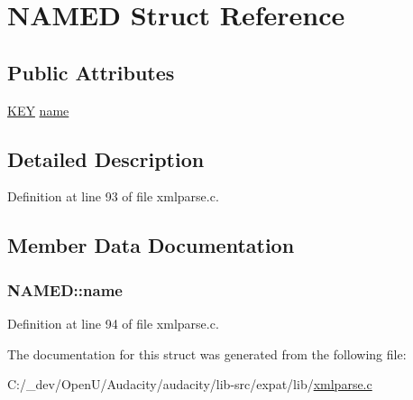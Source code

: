 \hypertarget{struct_n_a_m_e_d}{}\section{N\+A\+M\+ED Struct Reference}
\label{struct_n_a_m_e_d}
\subsection*{Public Attributes}
\begin{DoxyCompactItemize}
\item 
\hyperlink{xmlparse_8c_ab993fe892165ffeae5facd4ab9ded1e9}{K\+EY} \hyperlink{struct_n_a_m_e_d_a29524c1ac84928c0e9902dd70ad62e30}{name}
\end{DoxyCompactItemize}


\subsection{Detailed Description}


Definition at line 93 of file xmlparse.\+c.



\subsection{Member Data Documentation}
\subsubsection[{\texorpdfstring{name}{name}}]{ N\+A\+M\+E\+D\+::name}\hypertarget{struct_n_a_m_e_d_a29524c1ac84928c0e9902dd70ad62e30}{}\label{struct_n_a_m_e_d_a29524c1ac84928c0e9902dd70ad62e30}


Definition at line 94 of file xmlparse.\+c.



The documentation for this struct was generated from the following file\+:\begin{DoxyCompactItemize}
\item 
C\+:/\+\_\+dev/\+Open\+U/\+Audacity/audacity/lib-\/src/expat/lib/\hyperlink{xmlparse_8c}{xmlparse.\+c}\end{DoxyCompactItemize}
